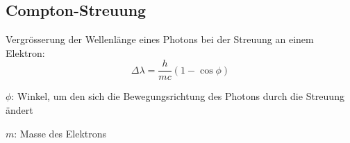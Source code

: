 	\subsection{Compton-Streuung} %
		Vergrösserung der Wellenlänge eines Photons bei der Streuung an einem Elektron:
		\[
			\Delta \lambda = \frac{h}{mc} (1 - \cos \phi)
		\]
		\begin{tightitemize}
			\item[$\phi$:] Winkel, um den sich die Bewegungsrichtung des Photons durch die Streuung ändert
			\item[$m$:] Masse des Elektrons
		\end{tightitemize}













































